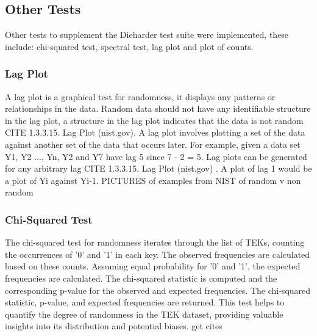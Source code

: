 \subsection{Other Tests}

Other tests to supplement the Dieharder test suite were implemented, these include: chi-squared test, spectral test, lag plot and plot of counts.\newline

\subsubsection{Lag Plot}
A lag plot is a graphical test for randomness, it displays any patterns or relationships in the data. Random data should not have any identifiable structure in the lag plot, a structure in the lag plot indicates that the data is not random CITE 1.3.3.15. Lag Plot (nist.gov). A lag plot involves plotting a set of the data against another set of the data that occurs later. For example, given a data set Y1, Y2 ..., Yn, Y2 and Y7 have lag 5 since 7 - 2 = 5. Lag plots can be generated for any arbitrary lag CITE 1.3.3.15. Lag Plot (nist.gov) . A plot of lag 1 would be a plot of Yi against Yi-1. PICTURES of examples from NIST of random v non random

\subsubsection{Chi-Squared Test}
The chi-squared test for randomness iterates through the list of TEKs, counting the occurrences of '0' and '1' in each key. The observed frequencies are calculated based on these counts. Assuming equal probability for '0' and '1', the expected frequencies are calculated. The chi-squared statistic is computed and the corresponding p-value for the observed and expected frequencies. The chi-squared statistic, p-value, and expected frequencies are returned. This test helps to quantify the degree of randomness in the TEK dataset, providing valuable insights into its distribution and potential biases. get cites

